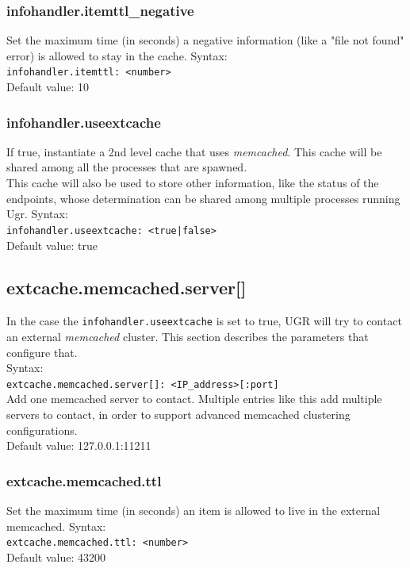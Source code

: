 \documentclass[12pt]{article} %
\begin{document}
\subsubsection{infohandler.itemttl\_negative}
Set the maximum time (in seconds) a negative information (like a "file not found" error) is allowed to stay in the cache.
Syntax:\\
\lstinline"infohandler.itemttl: <number>"\\
Default value: 10


\subsubsection{infohandler.useextcache}
If true, instantiate a 2nd level cache that uses \textit{memcached}. This cache will be shared among all the processes that are spawned.\\
This cache will also be used to store other information, like the status of the endpoints, whose determination can be shared among multiple processes running Ugr.
Syntax:\\
\lstinline"infohandler.useextcache: <true|false>"\\
Default value: true

\subsection{extcache.memcached.server[]}
In the case the \lstinline"infohandler.useextcache" is set to true, UGR will try to contact an external \textit{memcached} cluster.  This section describes the parameters that configure that.\\

 Syntax:\\

\lstinline"extcache.memcached.server[]: <IP_address>[:port]"\\

Add one memcached server to contact. Multiple entries like this add multiple servers to contact, in order to support advanced memcached clustering configurations.\\

Default value: 127.0.0.1:11211

\subsubsection{extcache.memcached.ttl}
Set the maximum time (in seconds) an item is allowed to live in the external memcached.
Syntax:\\
\lstinline"extcache.memcached.ttl: <number>"\\
Default value: 43200\\
\end{document}
